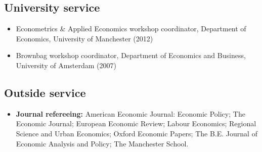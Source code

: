 \documentclass[11pt]{article}
\begin{document}
{\begin{itemize}[leftmargin=20pt]
\end{itemize}




\subsection*{\sc University service}
\begin{itemize}[leftmargin=20pt]
    \itemsep-.1cm
    \item[] Econometrics \& Applied Economics workshop coordinator, Department of Economics, University of Manchester (2012)
    \item[] Brownbag workshop coordinator, Department of Economics and Business, University of Amsterdam (2007)
\end{itemize}

\subsection*{\sc Outside service}

\begin{itemize}[itemsep=.9pt, leftmargin=20pt]
    \item[]\textbf{Journal refereeing:} American Economic Journal: Economic Policy; The Economic Journal; European Economic Review; Labour Economics; Regional Science and Urban Economics; Oxford Economic Papers; The B.E. Journal of Economic Analysis and Policy; The Manchester School.
\end{itemize}

}
\end{document}
